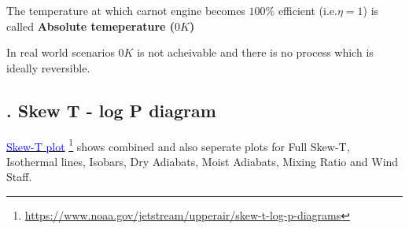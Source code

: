 \documentclass[fleqn,10pt]{SelfArx} %
\newcommand{\myhref}[2]{%
  \href{#1}{\textcolor{blue}{#2}}%
  \footnote{\url{#1}}%
}
\begin{document}
The temperature at which carnot engine becomes $100\%$ efficient (i.e.$\eta=1$) is called \textbf{Absolute temeperature ($0K$)} 

In real world scenarios $0K$ is not acheivable and there is no process which is ideally reversible.


\subsection{. Skew T - log P diagram}
\myhref{https://www.noaa.gov/jetstream/upperair/skew-t-log-p-diagrams}{Skew-T plot} shows combined and also seperate plots for Full Skew-T, Isothermal lines, Isobars, Dry Adiabats, Moist Adiabats, Mixing Ratio and Wind Staff.

\end{document}
